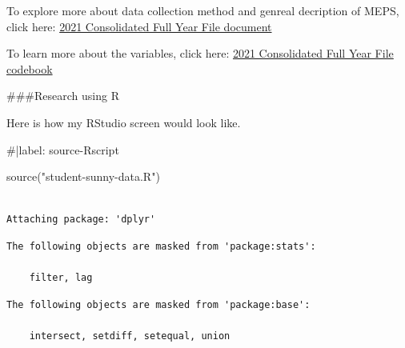 \documentclass[
]{apa7}
\newenvironment{Shaded}{\begin{snugshade}}{\end{snugshade}}
\newcommand{\CommentTok}[1]{\textcolor[rgb]{0.37,0.37,0.37}{#1}}
\newcommand{\FunctionTok}[1]{\textcolor[rgb]{0.28,0.35,0.67}{#1}}
\newcommand{\NormalTok}[1]{\textcolor[rgb]{0.00,0.23,0.31}{#1}}
\newcommand{\StringTok}[1]{\textcolor[rgb]{0.13,0.47,0.30}{#1}}
\begin{document}
To explore more about data collection method and genreal decription of
MEPS, click here: \href{data/h233doc.pdf}{2021 Consolidated Full Year
File document}

To learn more about the variables, click here:
\href{data/h233cb.pdf}{2021 Consolidated Full Year File codebook}

\#\#\#Research using R

Here is how my RStudio screen would look like.

\begin{Shaded}
\begin{Highlighting}[]
\CommentTok{\#|label: source{-}Rscript}

\FunctionTok{source}\NormalTok{(}\StringTok{"student{-}sunny{-}data.R"}\NormalTok{)}
\end{Highlighting}
\end{Shaded}

\begin{verbatim}

Attaching package: 'dplyr'
\end{verbatim}

\begin{verbatim}
The following objects are masked from 'package:stats':

    filter, lag
\end{verbatim}

\begin{verbatim}
The following objects are masked from 'package:base':

    intersect, setdiff, setequal, union
\end{verbatim}
\end{document}
